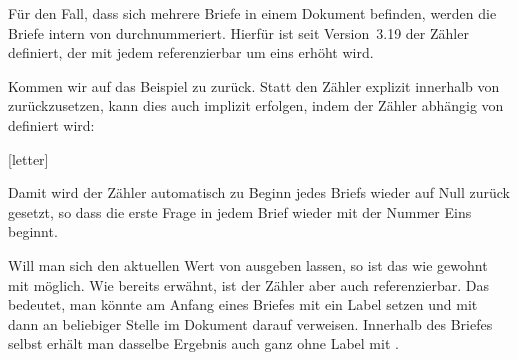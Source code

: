 \begin{Declaration}
\end{Declaration}
Für den Fall, dass
sich mehrere Briefe in einem Dokument befinden, werden die Briefe intern von
\KOMAScript{} durchnummeriert. Hierfür ist seit Version~3.19 der Zähler
 definiert, der mit jedem 
referenzierbar um eins erhöht wird.
\begin{Example}
  Kommen wir auf das Beispiel zu 
  zurück. Statt den Zähler explizit innerhalb von
   zurückzusetzen, kann dies auch implizit
  erfolgen, indem der Zähler  abhängig von 
  definiert wird:
\iffalse %
\begin{lstcode}
  \newcounter{Frage}[letter]
  \newcommand{\Frage}[1]{%
    \par
    \refstepcounter{Frage}%
    \noindent
    \begin{tabularx}{\textwidth}{l@{}X}
      \theFrage:~ & #1\\
    \end{tabularx}%
  }%
\end{lstcode}
\else %
\begin{lstcode}
  [letter]
  \newcommand{\Frage}[1]{%
    \refstepcounter{Frage}\par
    \noindent\begin{tabularx}{\textwidth}{l@{}X}
      \theFrage:~ & #1\\
    \end{tabularx}%
  }%
\end{lstcode}
\fi %
  Damit wird der Zähler automatisch zu Beginn jedes Briefs wieder auf Null
  zurück gesetzt, so dass die erste Frage in jedem Brief wieder mit der Nummer
  Eins beginnt.
\end{Example}

Will man sich den aktuellen Wert von  ausgeben lassen, so ist
das wie gewohnt mit  möglich. Wie bereits erwähnt, ist der
Zähler aber auch referenzierbar. Das bedeutet, man könnte am Anfang eines
Briefes mit  ein Label
setzen und mit  dann an beliebiger Stelle im
Dokument darauf verweisen. Innerhalb des Briefes selbst erhält man dasselbe
Ergebnis auch ganz ohne Label mit .


